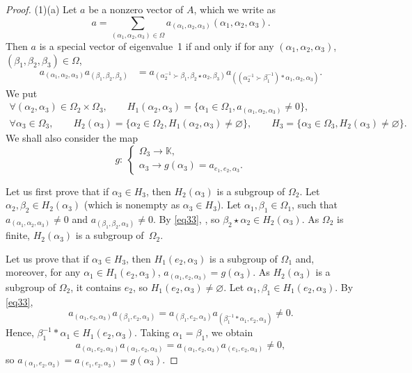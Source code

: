 \documentclass[pdftex]{sigma}
\numberwithin{equation}{section}
\begin{document}
\begin{proof}
(1)(a) Let $a$ be a nonzero vector of $A$, which we write as
\[a=\sum_{(\alpha_1,\alpha_2,\alpha_3)\in \Omega}a_{(\alpha_1,\alpha_2,\alpha_3)}(\alpha_1,\alpha_2,\alpha_3).\]
Then $a$ is a special vector of eigenvalue~1 if and only if for any $(\alpha_1,\alpha_2,\alpha_3)$, $(\beta_1,\beta_2,\beta_3)\in \Omega$,
\begin{align}
\label{eq33}a_{(\alpha_1,\alpha_2,\alpha_3)}a_{(\beta_1,\beta_2,\beta_3)}&=a_{(\alpha_2^{-1}\succ \beta_1,\beta_2\star \alpha_2,\beta_3)}a_{((\alpha_2^{-1}\succ \beta_1^{-1})*\alpha_1,\alpha_2,\alpha_3)}.
\end{align}
We put
\begin{gather*}
 \forall (\alpha_2,\alpha_3)\in \Omega_2\times \Omega_3,\qquad H_1(\alpha_2,\alpha_3)=\{\alpha_1\in \Omega_1, a_{(\alpha_1,\alpha_2,\alpha_3)}\neq 0\},\\
 \forall \alpha_3\in \Omega_3,\qquad H_2(\alpha_3)=\{\alpha_2\in \Omega_2, H_1(\alpha_2,\alpha_3)\neq \varnothing\},\qquad
 H_3=\{\alpha_3\in \Omega_3, H_2(\alpha_3)\neq \varnothing\}.
\end{gather*}
We shall also consider the map
\[g\colon \ \begin{cases}
\Omega_3 \longrightarrow \mathbb{K},\\
\alpha_3 \longrightarrow g(\alpha_3)=a_{e_1,e_2,\alpha_3}.
\end{cases}\]

Let us first prove that if $\alpha_3\in H_3$, then $H_2(\alpha_3)$ is a subgroup of $\Omega_2$. Let $\alpha_2,\beta_2\in H_2(\alpha_3)$ (which is nonempty as $\alpha_3\in H_3$).
Let $\alpha_1,\beta_1\in \Omega_1$, such that $a_{(\alpha_1,\alpha_2,\alpha_3)}\neq 0$ and $a_{(\beta_1,\beta_2,\alpha_3)}\neq 0$. By \eqref{eq33},
,
so $\beta_2\star \alpha_2\in H_2(\alpha_3)$. As $\Omega_2$ is finite, $H_2(\alpha_3)$ is a subgroup of~$\Omega_2$.

Let us prove that if $\alpha_3\in H_3$, then $H_1(e_2,\alpha_3)$ is a subgroup of $\Omega_1$ and, moreover, for any $\alpha_1\in H_1(e_2,\alpha_3)$, $a_{(\alpha_1,e_2,\alpha_3)}=g(\alpha_3)$.
As $H_2(\alpha_3)$ is a subgroup of $\Omega_2$, it contains $e_2$, so $H_1(e_2,\alpha_3)\neq \varnothing$. Let $\alpha_1,\beta_1\in H_1(e_2,\alpha_3)$. By \eqref{eq33},
\[a_{(\alpha_1,e_2,\alpha_3)}a_{(\beta_1,e_2,\alpha_3)}=a_{(\beta_1,e_2,\alpha_3)}a_{(\beta_1^{-1}*\alpha_1,e_2,\alpha_3)}\neq 0.\]
Hence, $\beta_1^{-1}*\alpha_1\in H_1(e_2,\alpha_3)$. Taking $\alpha_1=\beta_1$, we obtain{\samepage
\[a_{(\alpha_1,e_2,\alpha_3)}a_{(\alpha_1,e_2,\alpha_3)}=a_{(\alpha_1,e_2,\alpha_3)}a_{(e_1,e_2,\alpha_3)}\neq 0,\]
so $a_{(\alpha_1,e_2,\alpha_3)}=a_{(e_1,e_2,\alpha_3)}=g(\alpha_3)$.}


\end{proof}
\end{document}
